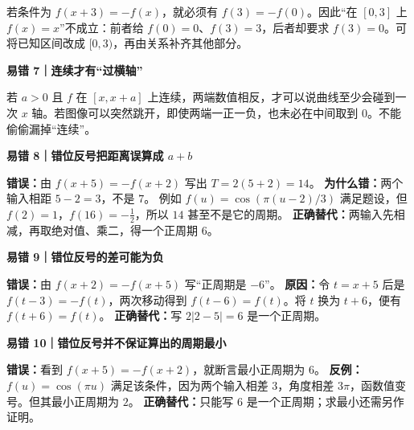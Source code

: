 \begin{trapbox}
若条件为 $f(x+3)=-f(x)$，就必须有 $f(3)=-f(0)$。因此“在 $[0,3]$ 上 $f(x)=x$”不成立：前者给 $f(0)=0$、$f(3)=3$，后者却要求 $f(3)=0$。可将已知区间改成 $[0,3)$，再由关系补齐其他部分。

\medskip
\end{trapbox}\clearpage\begin{trapbox}\textbf{易错 7｜连续才有“过横轴”}



若 $a>0$ 且 $f$ 在 $[x,x+a]$ 上连续，两端数值相反，才可以说曲线至少会碰到一次 $x$ 轴。若图像可以突然跳开，即使两端一正一负，也未必在中间取到 $0$。不能偷偷漏掉“连续”。
\end{trapbox}
\clearpage
\begin{trapbox}
\textbf{易错 8｜错位反号把距离误算成 $a+b$}


\textbf{错误：}由 $f(x+5)=-f(x+2)$ 写出 $T=2(5+2)=14$。
\textbf{为什么错：}两个输入相距 $5-2=3$，不是 $7$。
例如 $f(u)=\cos(\pi(u-2)/3)$ 满足题设，但 $f(2)=1$，$f(16)=-\tfrac12$，所以 $14$ 甚至不是它的周期。
\textbf{正确替代：}两输入先相减，再取绝对值、乘二，得一个正周期 $6$。

\end{trapbox}
\clearpage
\begin{trapbox}
\textbf{易错 9｜错位反号的差可能为负}


\textbf{错误：}由 $f(x+2)=-f(x+5)$ 写“正周期是 $-6$”。
\textbf{原因：}令 $t=x+5$ 后是 $f(t-3)=-f(t)$，两次移动得到 $f(t-6)=f(t)$。将 $t$ 换为 $t+6$，便有 $f(t+6)=f(t)$。
\textbf{正确替代：}写 $2|2-5|=6$ 是一个正周期。

\end{trapbox}
\clearpage
\begin{trapbox}
\textbf{易错 10｜错位反号并不保证算出的周期最小}


\textbf{错误：}看到 $f(x+5)=-f(x+2)$，就断言最小正周期为 $6$。
\textbf{反例：}$f(u)=\cos(\pi u)$ 满足该条件，因为两个输入相差 $3$，角度相差 $3\pi$，函数值变号。但其最小正周期为 $2$。
\textbf{正确替代：}只能写 $6$ 是一个正周期；求最小还需另作证明。

\end{trapbox}
